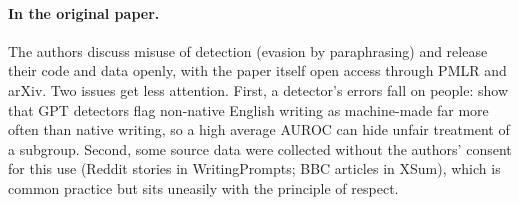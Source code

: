 \documentclass[11pt]{article}
\begin{document}
\paragraph{In the original paper.} The authors discuss misuse of detection (evasion by paraphrasing) and release their code and data openly, with the paper itself open access through PMLR and arXiv. Two issues get less attention. First, a detector's errors fall on people: \citet{liang2023biased} show that GPT detectors flag non-native English writing as machine-made far more often than native writing, so a high average AUROC can hide unfair treatment of a subgroup. Second, some source data were collected without the authors' consent for this use (Reddit stories in WritingPrompts; BBC articles in XSum), which is common practice but sits uneasily with the principle of respect.
\end{document}

